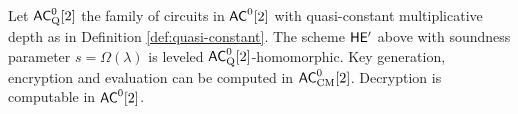 \begin{theorem}
\label{thm:hep-homomorphic}
Let ${\mathsf{AC}}^0_{\text{Q}}[2]$ the family of circuits in ${\mathsf{AC}}^0[2]$ with quasi-constant multiplicative depth as in Definition \ref{def:quasi-constant}.
The scheme $\mathsf{HE'}$ above with soundness parameter $s = \Omega(\lambda)$ is leveled ${\mathsf{AC}}^0_{\text{Q}}[2]$-homomorphic. Key generation, encryption and evaluation can be computed in ${\mathsf{AC}}^0_{\text{CM}}[2]$. Decryption is computable in ${\mathsf{AC}}^0[2]$.
\end{theorem}